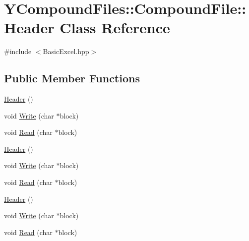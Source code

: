 \hypertarget{class_y_compound_files_1_1_compound_file_1_1_header}{}\section{Y\+Compound\+Files\+:\+:Compound\+File\+:\+:Header Class Reference}
\label{class_y_compound_files_1_1_compound_file_1_1_header}


{\ttfamily \#include $<$Basic\+Excel.\+hpp$>$}

\subsection*{Public Member Functions}
\begin{DoxyCompactItemize}
\item 
\hyperlink{class_y_compound_files_1_1_compound_file_1_1_header_a7bff1851d87f512f4d7c1c49d54d9fdb}{Header} ()
\item 
void \hyperlink{class_y_compound_files_1_1_compound_file_1_1_header_a95e9ad7f21e11c5e6a28ef360a564eb3}{Write} (char $\ast$block)
\item 
void \hyperlink{class_y_compound_files_1_1_compound_file_1_1_header_a2a876b51cf6847e4b4f1355bd14e3991}{Read} (char $\ast$block)
\item 
\hyperlink{class_y_compound_files_1_1_compound_file_1_1_header_a7bff1851d87f512f4d7c1c49d54d9fdb}{Header} ()
\item 
void \hyperlink{class_y_compound_files_1_1_compound_file_1_1_header_a95e9ad7f21e11c5e6a28ef360a564eb3}{Write} (char $\ast$block)
\item 
void \hyperlink{class_y_compound_files_1_1_compound_file_1_1_header_a2a876b51cf6847e4b4f1355bd14e3991}{Read} (char $\ast$block)
\item 
\hyperlink{class_y_compound_files_1_1_compound_file_1_1_header_a7bff1851d87f512f4d7c1c49d54d9fdb}{Header} ()
\item 
void \hyperlink{class_y_compound_files_1_1_compound_file_1_1_header_a95e9ad7f21e11c5e6a28ef360a564eb3}{Write} (char $\ast$block)
\item 
void \hyperlink{class_y_compound_files_1_1_compound_file_1_1_header_a2a876b51cf6847e4b4f1355bd14e3991}{Read} (char $\ast$block)
\end{DoxyCompactItemize}
